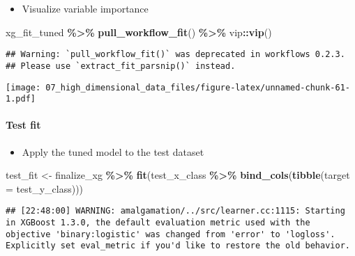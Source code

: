 \documentclass[
]{book}
\newenvironment{Shaded}{\begin{snugshade}}{\end{snugshade}}
\newcommand{\DataTypeTok}[1]{\textcolor[rgb]{0.13,0.29,0.53}{#1}}
\newcommand{\KeywordTok}[1]{\textcolor[rgb]{0.13,0.29,0.53}{\textbf{#1}}}
\newcommand{\NormalTok}[1]{#1}
\newcommand{\OperatorTok}[1]{\textcolor[rgb]{0.81,0.36,0.00}{\textbf{#1}}}
\newcommand{\StringTok}[1]{\textcolor[rgb]{0.31,0.60,0.02}{#1}}
\providecommand{\tightlist}{%
  \setlength{\itemsep}{0pt}\setlength{\parskip}{0pt}}
\begin{document}
\begin{itemize}
\tightlist
\item
  Visualize variable importance
\end{itemize}

\begin{Shaded}
\begin{Highlighting}[]
\NormalTok{xg\_fit\_tuned }\OperatorTok{\%\textgreater{}\%}
\StringTok{  }\KeywordTok{pull\_workflow\_fit}\NormalTok{() }\OperatorTok{\%\textgreater{}\%}
\StringTok{  }\NormalTok{vip}\OperatorTok{::}\KeywordTok{vip}\NormalTok{()}
\end{Highlighting}
\end{Shaded}

\begin{verbatim}
## Warning: `pull_workflow_fit()` was deprecated in workflows 0.2.3.
## Please use `extract_fit_parsnip()` instead.
\end{verbatim}

\texttt{[image: 07\_high\_dimensional\_data\_files/figure-latex/unnamed-chunk-61-1.pdf]}

\hypertarget{test-fit-3}{%
\paragraph{Test fit}\label{test-fit-3}}

\begin{itemize}
\tightlist
\item
  Apply the tuned model to the test dataset
\end{itemize}

\begin{Shaded}
\begin{Highlighting}[]
\NormalTok{test\_fit \textless{}{-}}\StringTok{ }\NormalTok{finalize\_xg }\OperatorTok{\%\textgreater{}\%}
\StringTok{  }\KeywordTok{fit}\NormalTok{(test\_x\_class }\OperatorTok{\%\textgreater{}\%}\StringTok{ }\KeywordTok{bind\_cols}\NormalTok{(}\KeywordTok{tibble}\NormalTok{(}\DataTypeTok{target =}\NormalTok{ test\_y\_class)))}
\end{Highlighting}
\end{Shaded}

\begin{verbatim}
## [22:48:00] WARNING: amalgamation/../src/learner.cc:1115: Starting in XGBoost 1.3.0, the default evaluation metric used with the objective 'binary:logistic' was changed from 'error' to 'logloss'. Explicitly set eval_metric if you'd like to restore the old behavior.
\end{verbatim}
\end{document}
